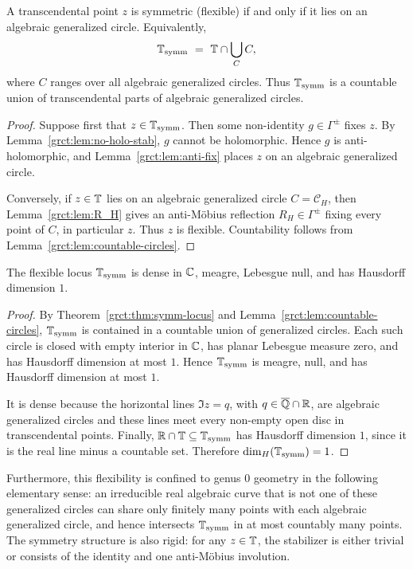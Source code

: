 \begin{theorem}\label{grct:thm:symm-locus}
	A transcendental point $z$ is symmetric (flexible) if and only if it lies on an algebraic generalized circle. Equivalently,
	\[
		\ssymm \ = \ \Tc\cap\bigcup_C C,
	\]
	where $C$ ranges over all algebraic generalized circles. Thus $\mathbb{T}_{\mathrm{symm}}$ is a countable union of transcendental parts of algebraic generalized circles.
\end{theorem}
\begin{proof}
	Suppose first that $z\in\mathbb{T}_{\mathrm{symm}}$. Then some non-identity $g\in\Gamma^{\pm}$ fixes $z$. By Lemma~\ref{grct:lem:no-holo-stab}, $g$ cannot be holomorphic. Hence $g$ is anti-holomorphic, and Lemma~\ref{grct:lem:anti-fix} places $z$ on an algebraic generalized circle.
	
	Conversely, if $z\in\mathbb{T}$ lies on an algebraic generalized circle $C=\mathcal C_H$, then Lemma~\ref{grct:lem:R_H} gives an anti-Möbius reflection $R_H\in\Gamma^{\pm}$ fixing every point of $C$, in particular $z$. Thus $z$ is flexible. Countability follows from Lemma~\ref{grct:lem:countable-circles}.
\end{proof}

\begin{proposition}\label{grct:prop:flexible-footprint}
	The flexible locus $\mathbb{T}_{\mathrm{symm}}$ is dense in $\mathbb{C}$, meagre, Lebesgue null, and has Hausdorff dimension $1$.
\end{proposition}
\begin{proof}
	By Theorem~\ref{grct:thm:symm-locus} and Lemma~\ref{grct:lem:countable-circles}, $\mathbb{T}_{\mathrm{symm}}$ is contained in a countable union of generalized circles. Each such circle is closed with empty interior in $\mathbb{C}$, has planar Lebesgue measure zero, and has Hausdorff dimension at most $1$. Hence $\mathbb{T}_{\mathrm{symm}}$ is meagre, null, and has Hausdorff dimension at most $1$.
	
	It is dense because the horizontal lines $\Im z=q$, with $q\in\overline{\mathbb{Q}}\cap\mathbb{R}$, are algebraic generalized circles and these lines meet every non-empty open disc in transcendental points. Finally, $\mathbb{R}\cap\mathbb{T}\subseteq\mathbb{T}_{\mathrm{symm}}$ has Hausdorff dimension $1$, since it is the real line minus a countable set. Therefore $\dim_H(\mathbb{T}_{\mathrm{symm}})=1$.
\end{proof}

Furthermore, this flexibility is confined to genus 0 geometry in the following elementary sense: an irreducible real algebraic curve that is not one of these generalized circles can share only finitely many points with each algebraic generalized circle, and hence intersects $\mathbb{T}_{\mathrm{symm}}$ in at most countably many points. The symmetry structure is also rigid: for any $z\in\mathbb{T}$, the stabilizer is either trivial or consists of the identity and one anti-Möbius involution.

